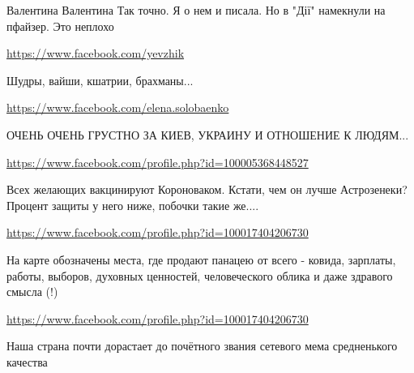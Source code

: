 \documentclass[a4paper,11pt]{extreport}
\begin{document}
\begin{itemize}
\begin{itemize}
Валентина Валентина Так точно. Я о нем и писала. Но в "Дії" намекнули на пфайзер. Это неплохо

\url{https://www.facebook.com/yevzhik}

Шудры, вайши, кшатрии, брахманы...

\url{https://www.facebook.com/elena.solobaenko}

ОЧЕНЬ ОЧЕНЬ ГРУСТНО ЗА КИЕВ, УКРАИНУ И ОТНОШЕНИЕ К ЛЮДЯМ...

\end{itemize}
\url{https://www.facebook.com/profile.php?id=100005368448527}

Всех желающих вакцинируют Короноваком. Кстати, чем он лучше Астрозенеки? Процент защиты у него ниже, побочки такие же....

\url{https://www.facebook.com/profile.php?id=100017404206730}

На карте обозначены места, где продают панацею от всего - ковида, зарплаты, работы, выборов, духовных ценностей, человеческого облика и даже здравого смысла (!)

\begin{itemize}
\url{https://www.facebook.com/profile.php?id=100017404206730}

Наша страна почти дорастает до почётного звания сетевого мема средненького качества

\end{itemize}
\end{itemize}
\end{document}
